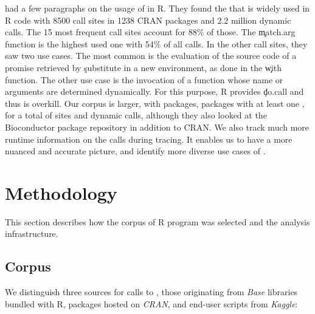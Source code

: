 \documentclass[screen,acmsmall]{acmart}
\begin{document}
\citet{ecoop12} had a few paragraphs on the usage of \eval in R. They found the
that \eval  is widely used in R code with 8500 call sites in 1238 CRAN packages and 2.2 million dynamic calls.   The 15 most frequent call sites account for 88\% of those. The
\c{match.arg} function is the highest used one with 54\% of all calls. In the
other call sites, they saw two use cases. The most common is the evaluation of
the source code of a promise retrieved by \c{substitute} in a new environment,
\eg as done in the \c{with} function. The other use case is the invocation of a
function whose name or arguments are determined dynamically. For this purpose, R provides \c{do.call} and thus \eval is overkill. Our corpus is larger, with \CranPackages packages, \packageTriggeredpkgs packages with at least one \eval, for a total of \PkgHitEvalCallSites sites and \packageAllcallsRnd dynamic calls, although they also looked at the Bioconductor package repository in addition to CRAN. We also track much more runtime information on the \eval calls during tracing. It enables us to have a more nuanced and accurate picture, and identify more diverse use cases of \eval.



\section{Methodology}

This section describes how the corpus of R program was selected and the analysis
infrastructure.

\subsection{Corpus}

We distinguish three sources for calls to \eval, those originating from
\emph{Base} libraries bundled with R, packages hosted on \emph{CRAN}, and
end-user scripts from \emph{Kaggle}: 
\end{document}
